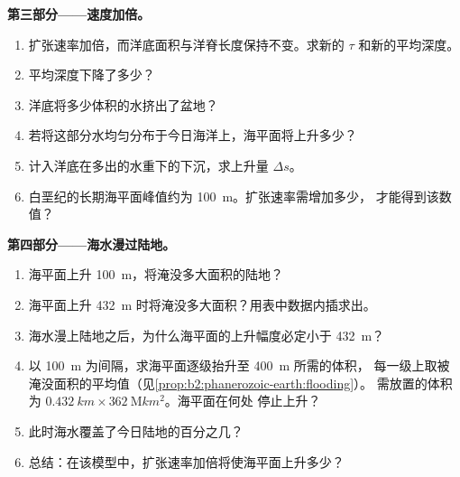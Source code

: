 \begin{problem}
\noindent\textbf{第三部分——速度加倍。}
\begin{enumerate}[resume]
  \item 扩张速率加倍，而洋底面积与洋脊长度保持不变。求新的 $\tau$
        和新的平均深度。
  \item 平均深度下降了多少？
  \item 洋底将多少体积的水挤出了盆地？
  \item 若将这部分水均匀分布于今日海洋上，海平面将上升多少？
  \item 计入洋底在多出的水重下的下沉，求上升量 $\Delta s$。
  \item 白垩纪的长期海平面峰值约为 \qty{100}{m}。扩张速率需增加多少，
        才能得到该数值？
\end{enumerate}

\noindent\textbf{第四部分——海水漫过陆地。}
\begin{enumerate}[resume]
  \item 海平面上升 \qty{100}{m}，将淹没多大面积的陆地？
  \item 海平面上升 \qty{432}{m} 时将淹没多大面积？用表中数据内插求出。
  \item 海水漫上陆地之后，为什么海平面的上升幅度必定小于 \qty{432}{m}？
  \item 以 \qty{100}{m} 为间隔，求海平面逐级抬升至 \qty{400}{m} 所需的体积，
        每一级上取被淹没面积的平均值（见\cref{prop:b2:phanerozoic-earth:flooding}）。
        需放置的体积为 $\qty{0.432}{km} \times \qty{362}{\mega km^2}$。海平面在何处
        停止上升？
  \item 此时海水覆盖了今日陆地的百分之几？
  \item 总结：在该模型中，扩张速率加倍将使海平面上升多少？
\end{enumerate}
\end{problem}
